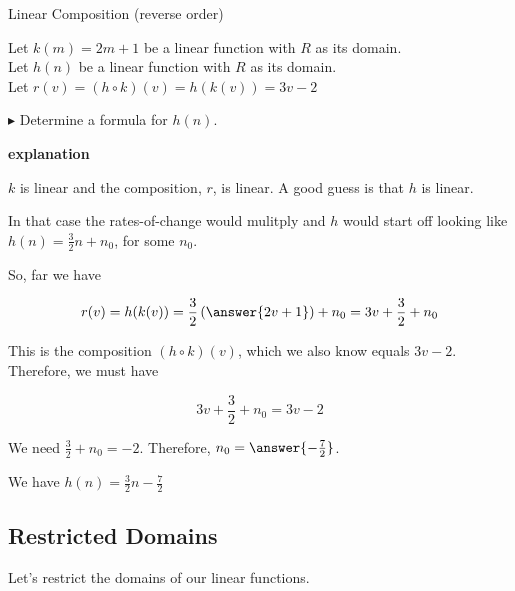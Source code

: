 \documentclass{ximera}
\begin{document}
\begin{example} Linear Composition (reverse order)

Let $k(m) = 2 m + 1$ be a linear function with \textbf{$R$} as its domain. \\
Let $h(n)$ be a linear function with \textbf{$R$} as its domain. \\


Let $r(v) = (h \circ k)(v) = h(k(v)) = 3 v - 2$ 

$\blacktriangleright$  Determine a formula for $h(n)$.




\textbf{\textcolor{red!75!green}{explanation}} 


$k$ is linear and the composition, $r$, is linear. A good guess is that $h$ is linear.  

In that case the rates-of-change would mulitply and $h$ would start off looking like $h(n) = \frac{3}{2} n + n_0$, for some $n_0$.


So, far we have 

\[   r(v) = h(k(v)) = \frac{3}{2} \left( \answer{2 v + 1} \right) + n_0 =  3 v + \frac{3}{2} + n_0\]


This is the composition $(h \circ k)(v)$, which we also know equals $3 v - 2$.  Therefore, we must have 

\[
3 v + \frac{3}{2} + n_0  = 3 v - 2
\]


We need $\frac{3}{2} + n_0 = -2$.  Therefore, $n_0 = \answer{-\frac{7}{2}}$.


We have $h(n) = \frac{3}{2} n - \frac{7}{2}$



\end{example}

















\subsection*{Restricted Domains}


Let's restrict the domains of our linear functions.
\end{document}
